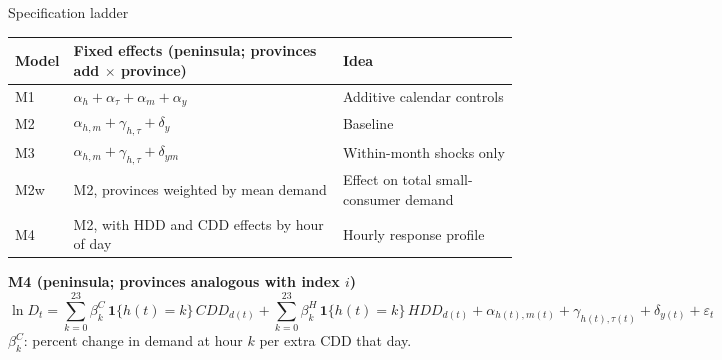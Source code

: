 \documentclass[aspectratio=169,11pt]{beamer}
\newcommand{\ind}{\mathbf{1}}
\begin{document}
\begin{frame}{Specification ladder}
  \small
  \begin{tabular}{@{}lll@{}}
    \toprule
    Model & Fixed effects (peninsula; provinces add $\times$ province) & Idea \\
    \midrule
    M1  & $\alpha_h + \alpha_\tau + \alpha_m + \alpha_y$ & Additive calendar controls \\
    M2  & $\alpha_{h,m} + \gamma_{h,\tau} + \delta_y$ & Baseline \\
    M3  & $\alpha_{h,m} + \gamma_{h,\tau} + \delta_{ym}$ & Within-month shocks only \\
    M2w & M2, provinces weighted by mean demand & Effect on total small-consumer demand \\
    M4  & M2, with HDD and CDD effects by hour of day & Hourly response profile \\
    \bottomrule
  \end{tabular}
  \vspace{8pt}
  \textbf{M4 (peninsula; provinces analogous with index $i$)}
  \[
    \ln D_t = \sum_{k=0}^{23} \beta^{C}_{k}\, \ind\{h(t)=k\}\, CDD_{d(t)}
      + \sum_{k=0}^{23} \beta^{H}_{k}\, \ind\{h(t)=k\}\, HDD_{d(t)}
      + \alpha_{h(t),m(t)} + \gamma_{h(t),\tau(t)} + \delta_{y(t)} + \varepsilon_t
  \]
  \footnotesize $\beta^{C}_{k}$: percent change in demand at hour $k$ per extra CDD that day.
\end{frame}
\end{document}
